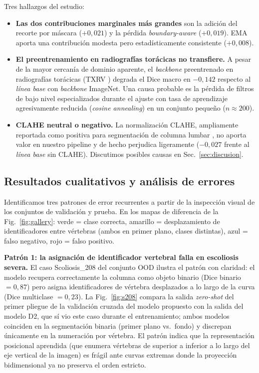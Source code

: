\documentclass[conference]{IEEEtran}
\begin{document}
Tres hallazgos del estudio:

\begin{itemize}
\item \textbf{Las dos contribuciones marginales más grandes} son la adición del recorte por máscara ($+0{,}021$) y la pérdida \emph{boundary-aware} ($+0{,}019$). EMA aporta una contribución modesta pero estadísticamente consistente ($+0{,}008$).
\item \textbf{El preentrenamiento en radiografías torácicas no transfiere.} A pesar de la mayor cercanía de dominio aparente, el \emph{backbone} preentrenado en radiografías torácicas (TXRV \cite{txrv}) degrada el Dice macro en $-0{,}142$ respecto al \emph{línea base} con \emph{backbone} ImageNet. Una causa probable es la pérdida de filtros de bajo nivel especializados durante el ajuste con tasa de aprendizaje agresivamente reducida (\emph{cosine annealing}) en un conjunto pequeño ($n \approx 200$).
\item \textbf{CLAHE neutral o negativo.} La normalización CLAHE, ampliamente reportada como positiva para segmentación de columna lumbar \cite{mdpi_clahe}, no aporta valor en nuestro pipeline y de hecho perjudica ligeramente ($-0{,}027$ frente al \emph{línea base} sin CLAHE). Discutimos posibles causas en Sec.~\ref{sec:discusion}.
\end{itemize}

\subsection{Resultados cualitativos y análisis de errores}
\label{sec:errores}

Identificamos tres patrones de error recurrentes a partir de la inspección visual de los conjuntos de validación y prueba. En los mapas de diferencia de la Fig.~\ref{fig:gallery}: verde = clase correcta, amarillo = desplazamiento de identificadores entre vértebras (ambos en primer plano, clases distintas), azul = falso negativo, rojo = falso positivo.

\textbf{Patrón 1: la asignación de identificador vertebral falla en escoliosis severa.} El caso Scoliosis\_208 del conjunto OOD ilustra el patrón con claridad: el modelo recupera correctamente la columna como objeto binario (Dice binario $= 0{,}87$) pero asigna identificadores de vértebra desplazados a lo largo de la curva (Dice multiclase $= 0{,}23$). La Fig.~\ref{fig:s208} compara la salida \emph{zero-shot} del primer pliegue de la validación cruzada del modelo propuesto con la salida del modelo D2, que sí vio este caso durante el entrenamiento; ambos modelos coinciden en la segmentación binaria (primer plano vs.\ fondo) y discrepan únicamente en la numeración por vértebra. El patrón indica que la representación posicional aprendida (que enumera vértebras de superior a inferior a lo largo del eje vertical de la imagen) es frágil ante curvas extremas donde la proyección bidimensional ya no preserva el orden estricto.
\end{document}
